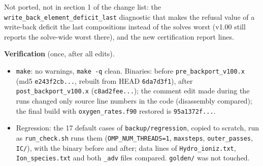 \documentclass[english,a4paper]{my_memo}
\providecommand{\tightlist}{\setlength{\itemsep}{0pt}\setlength{\parskip}{0pt}}
\begin{document}
Not ported, not in section 1 of the change list: the \texttt{write\_back\_element\_deficit\_last} diagnostic that makes the refusal value of a write-back deficit the last composition\textquotesingle s instead of the solve\textquotesingle s worst (v1.00 still reports the solve-wide worst there), and the new certification report lines.

\textbf{Verification} (once, after all edits).

\begin{itemize}
\tightlist
\item
  \texttt{make}: no warnings, \texttt{make\ -q} clean. Binaries: before \texttt{pre\_backport\_v100.x} (md5 \texttt{e243f2cb...}, rebuilt from HEAD \texttt{6da7d3f1}), after \texttt{post\_backport\_v100.x} (\texttt{c8ad2fee...}); the comment edit made during the runs changed only source line numbers in the code (disassembly compared); the final build with \texttt{oxygen\_rates.f90} restored is \texttt{95a1372f...}.
\item
  Regression: the 17 default cases of \texttt{backup/regression}, copied to scratch, run as \texttt{run\_check.sh} runs them (\texttt{OMP\_NUM\_THREADS=1}, \texttt{maxsteps}, \texttt{outer\_passes}, \texttt{IC/}), with the binary before and after; data lines of \texttt{Hydro\_ioniz.txt}, \texttt{Ion\_species.txt} and both \texttt{\_adv} files compared. \texttt{golden/} was not touched.


\end{itemize}
\end{document}
